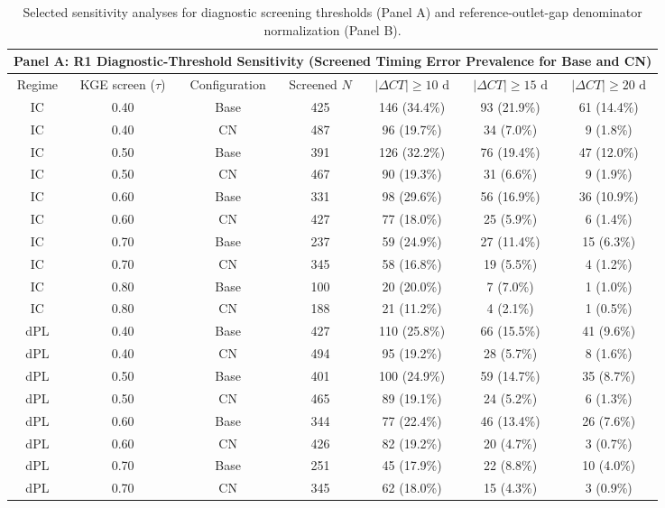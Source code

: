 \begin{table}[t]
\centering
\small
\begin{threeparttable}
\caption{Selected sensitivity analyses for diagnostic screening thresholds (Panel A) and reference-outlet-gap denominator normalization (Panel B).}
\label{tab:sensitivity_audits}
\begin{tabular}{ccccccc}
\toprule
\multicolumn{7}{l}{\textbf{Panel A: R1 Diagnostic-Threshold Sensitivity (Screened Timing Error Prevalence for Base and CN)}} \\
\midrule
Regime & KGE screen ($\tau$) & Configuration & Screened $N$ & $|\Delta CT| \ge 10\text{ d}$ & $|\Delta CT| \ge 15\text{ d}$ & $|\Delta CT| \ge 20\text{ d}$ \\
\midrule
IC & 0.40 & Base & 425 & 146 (34.4\%) & 93 (21.9\%) & 61 (14.4\%) \\
IC & 0.40 & CN & 487 & 96 (19.7\%) & 34 (7.0\%) & 9 (1.8\%) \\
IC & 0.50 & Base & 391 & 126 (32.2\%) & 76 (19.4\%) & 47 (12.0\%) \\
IC & 0.50 & CN & 467 & 90 (19.3\%) & 31 (6.6\%) & 9 (1.9\%) \\
IC & 0.60 & Base & 331 & 98 (29.6\%) & 56 (16.9\%) & 36 (10.9\%) \\
IC & 0.60 & CN & 427 & 77 (18.0\%) & 25 (5.9\%) & 6 (1.4\%) \\
IC & 0.70 & Base & 237 & 59 (24.9\%) & 27 (11.4\%) & 15 (6.3\%) \\
IC & 0.70 & CN & 345 & 58 (16.8\%) & 19 (5.5\%) & 4 (1.2\%) \\
IC & 0.80 & Base & 100 & 20 (20.0\%) & 7 (7.0\%) & 1 (1.0\%) \\
IC & 0.80 & CN & 188 & 21 (11.2\%) & 4 (2.1\%) & 1 (0.5\%) \\
dPL & 0.40 & Base & 427 & 110 (25.8\%) & 66 (15.5\%) & 41 (9.6\%) \\
dPL & 0.40 & CN & 494 & 95 (19.2\%) & 28 (5.7\%) & 8 (1.6\%) \\
dPL & 0.50 & Base & 401 & 100 (24.9\%) & 59 (14.7\%) & 35 (8.7\%) \\
dPL & 0.50 & CN & 465 & 89 (19.1\%) & 24 (5.2\%) & 6 (1.3\%) \\
dPL & 0.60 & Base & 344 & 77 (22.4\%) & 46 (13.4\%) & 26 (7.6\%) \\
dPL & 0.60 & CN & 426 & 82 (19.2\%) & 20 (4.7\%) & 3 (0.7\%) \\
dPL & 0.70 & Base & 251 & 45 (17.9\%) & 22 (8.8\%) & 10 (4.0\%) \\
dPL & 0.70 & CN & 345 & 62 (18.0\%) & 15 (4.3\%) & 3 (0.9\%) \\

\end{tabular}
\end{threeparttable}
\end{table}

